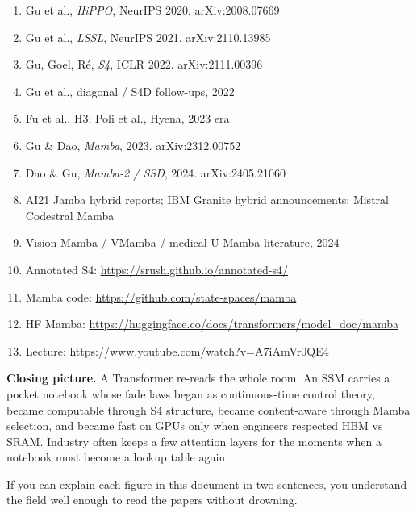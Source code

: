 \documentclass[11pt,a4paper]{article}
\begin{document}
\begin{enumerate}[leftmargin=*]
  \item Gu et al., \emph{HiPPO}, NeurIPS 2020. arXiv:2008.07669
  \item Gu et al., \emph{LSSL}, NeurIPS 2021. arXiv:2110.13985
  \item Gu, Goel, R\'{e}, \emph{S4}, ICLR 2022. arXiv:2111.00396
  \item Gu et al., diagonal / S4D follow-ups, 2022
  \item Fu et al., H3; Poli et al., Hyena, 2023 era
  \item Gu \& Dao, \emph{Mamba}, 2023. arXiv:2312.00752
  \item Dao \& Gu, \emph{Mamba-2 / SSD}, 2024. arXiv:2405.21060
  \item AI21 Jamba hybrid reports; IBM Granite hybrid announcements; Mistral Codestral Mamba
  \item Vision Mamba / VMamba / medical U-Mamba literature, 2024--
  \item Annotated S4: \url{https://srush.github.io/annotated-s4/}
  \item Mamba code: \url{https://github.com/state-spaces/mamba}
  \item HF Mamba: \url{https://huggingface.co/docs/transformers/model_doc/mamba}
  \item Lecture: \url{https://www.youtube.com/watch?v=A7iAmVr0QE4}
\end{enumerate}

\begin{notebox}
\textbf{Closing picture.}
A Transformer re-reads the whole room.
An SSM carries a pocket notebook whose fade laws began as continuous-time control theory, became computable through S4 structure, became content-aware through Mamba selection, and became fast on GPUs only when engineers respected HBM vs SRAM.
Industry often keeps a few attention layers for the moments when a notebook must become a lookup table again.

If you can explain each figure in this document in two sentences, you understand the field well enough to read the papers without drowning.
\end{notebox}
\end{document}
